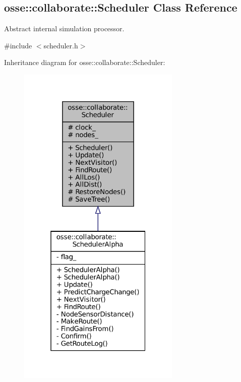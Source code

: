 \hypertarget{classosse_1_1collaborate_1_1_scheduler}{}\subsection{osse\+:\+:collaborate\+:\+:Scheduler Class Reference}
\label{classosse_1_1collaborate_1_1_scheduler}


Abstract internal simulation processor.  




{\ttfamily \#include $<$scheduler.\+h$>$}



Inheritance diagram for osse\+:\+:collaborate\+:\+:Scheduler\+:
\nopagebreak
\begin{figure}[H]
\begin{center}
\leavevmode
\includegraphics[width=220pt]{classosse_1_1collaborate_1_1_scheduler__inherit__graph}
\end{center}
\end{figure}
